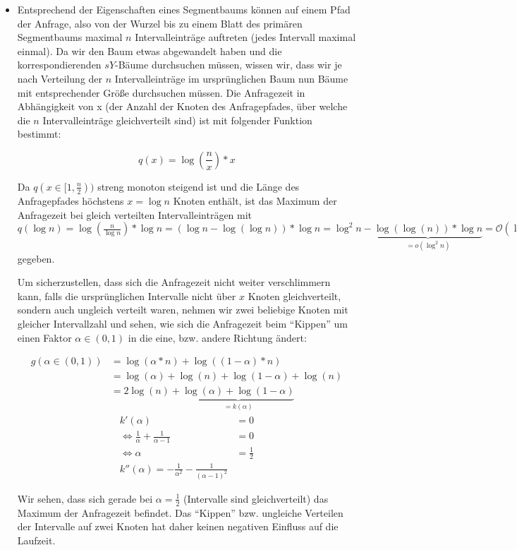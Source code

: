 \documentclass[a4paper]{article}
\begin{document}
\begin{itemize}
	\item Entsprechend der Eigenschaften eines Segmentbaums können auf einem Pfad der Anfrage,
	also von der Wurzel bis zu einem Blatt des primären Segmentbaums maximal $n$ Intervalleinträge
	auftreten (jedes Intervall maximal einmal). Da wir den Baum etwas abgewandelt haben und 
	die korrespondierenden $sY$-Bäume durchsuchen müssen, wissen wir, dass wir je nach Verteilung
	der $n$ Intervalleinträge im ursprünglichen Baum nun Bäume mit entsprechender Größe durchsuchen müssen. Die Anfragezeit in Abhängigkeit von x (der Anzahl der Knoten des Anfragepfades, über welche die $n$ Intervalleinträge gleichverteilt sind) ist mit folgender Funktion bestimmt:
	
	$$q(x) = \log(\frac{n}{x}) * x$$
	
	Da $q(x \in [1,\frac{n}{2}))$ streng monoton steigend ist und die Länge des Anfragepfades
	höchstens $x = \log n$ Knoten enthält, ist das Maximum der Anfragezeit bei gleich verteilten
	Intervalleinträgen mit $q(\log n) = \log(\frac{n}{\log n}) * \log n = 
	(\log n - \log(\log n)) * \log n = \log^2 n - 
	\underbrace{\log(\log(n)) * \log n}_{= o(\log^2 n)} = \mathcal{O}(\log^2 n)$ gegeben.
	
	Um sicherzustellen, dass sich die Anfragezeit nicht weiter verschlimmern kann, falls
	die ursprünglichen Intervalle nicht über $x$ Knoten gleichverteilt, sondern auch ungleich
	verteilt waren, nehmen wir zwei beliebige Knoten mit gleicher Intervallzahl und sehen, 
	wie sich die Anfragezeit beim "`Kippen"' um einen Faktor $\alpha \in (0,1)$ in die eine, bzw. andere Richtung ändert:
	
	\begin{align*}
	g(\alpha \in (0,1)) &= \log (\alpha * n) + \log((1-\alpha) * n) \\
						&= \log (\alpha) + \log(n) + \log (1-\alpha) + \log (n) \\
						&= 2\log (n) + \underbrace{\log(\alpha) + \log (1-\alpha)}_{= k(\alpha)}						
	\end{align*}
	\begin{align*}
	k'(\alpha) &= 0\\
	\Leftrightarrow \frac{1}{\alpha} + \frac{1}{\alpha - 1} &= 0\\	 
	\Leftrightarrow \alpha &= \frac{1}{2}\\
	k''(\alpha) = -\frac{1}{\alpha^2} - \frac{1}{(\alpha-1)^2}
	\end{align*}
	
	Wir sehen, dass sich gerade bei $\alpha = \frac{1}{2}$ (Intervalle sind gleichverteilt) das Maximum der Anfragezeit befindet. 
Das "`Kippen"' bzw. ungleiche Verteilen der Intervalle auf zwei Knoten hat daher keinen negativen
Einfluss auf die Laufzeit. 


\end{itemize}
\end{document}
